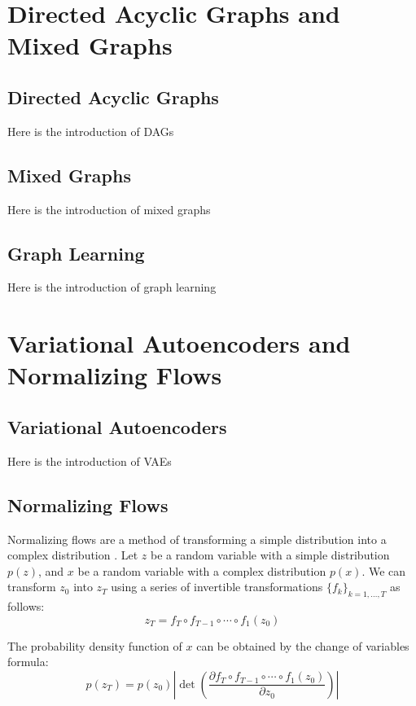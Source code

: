 \documentclass[10pt]{article}
\begin{document}
\section{Directed Acyclic Graphs and Mixed Graphs}
\subsection{Directed Acyclic Graphs}

Here is the introduction of DAGs

\subsection{Mixed Graphs}

Here is the introduction of mixed graphs

\subsection{Graph Learning}

Here is the introduction of graph learning

\section{Variational Autoencoders and Normalizing Flows}

\subsection{Variational Autoencoders}

Here is the introduction of VAEs

\subsection{Normalizing Flows}

Normalizing flows are a method of transforming a simple distribution into a complex distribution \cite{rezende15normalizingflows}. Let $z$ be a random variable with a simple distribution $p(z)$, and $x$ be a random variable with a complex distribution $p(x)$. We can transform $z_0$ into $z_T$ using a series of invertible transformations $\{f_k\}_{k=1,\ldots,T}$ as follows:
\begin{equation}
    z_T = f_T \circ f_{T-1} \circ \cdots \circ f_1(z_0)
\end{equation}

The probability density function of $x$ can be obtained by the change of variables formula:
\begin{equation}
    p(z_T) = p(z_0) \left| \det \left( \frac{\partial f_T \circ f_{T-1} \circ \cdots \circ f_1(z_0)}{\partial z_0} \right) \right|
\end{equation}
\end{document}
